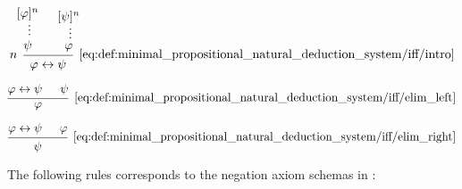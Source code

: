 \begin{definition}
\begin{thmenum}
    \begin{minipage}{0.3\textwidth}
      \begin{equation*}\taglabel[\( \leftrightarrow^+ \)]{eq:def:minimal_propositional_natural_deduction_system/iff/intro}
        \begin{prooftree}
          \hypo{ [\varphi]^n }
          \ellipsis {} { \psi }
          \hypo{ [\psi]^n }
          \ellipsis {} { \varphi }
          \infer[left label=\( n \)]2[\ref{eq:def:minimal_propositional_natural_deduction_system/iff/intro}]{ \varphi \leftrightarrow \psi }
        \end{prooftree}
      \end{equation*}
    \end{minipage}
    \hfill
    \begin{minipage}{0.3\textwidth}
      \begin{equation*}\taglabel[\( \leftrightarrow_L^- \)]{eq:def:minimal_propositional_natural_deduction_system/iff/elim_left}
        \begin{prooftree}
          \hypo{ \varphi \leftrightarrow \psi }
          \hypo{ \psi }
          \infer2[\ref{eq:def:minimal_propositional_natural_deduction_system/iff/elim_left}]{ \varphi }
        \end{prooftree}
      \end{equation*}
    \end{minipage}
    \hfill
    \begin{minipage}{0.3\textwidth}
      \begin{equation*}\taglabel[\( \leftrightarrow_R^- \)]{eq:def:minimal_propositional_natural_deduction_system/iff/elim_right}
        \begin{prooftree}
          \hypo{ \varphi \leftrightarrow \psi }
          \hypo{ \varphi }
          \infer2[\ref{eq:def:minimal_propositional_natural_deduction_system/iff/elim_right}]{ \psi }
        \end{prooftree}
      \end{equation*}
    \end{minipage}

     The following rules corresponds to the negation axiom schemas in :


\end{thmenum}
\end{definition}
